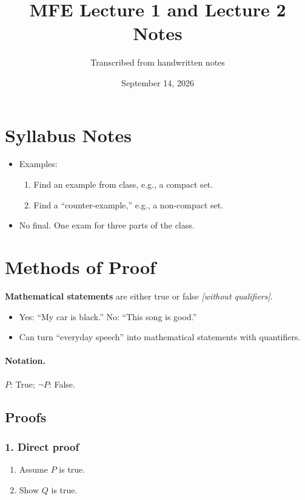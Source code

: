 \documentclass[11pt]{article}
\title{MFE Lecture 1 and Lecture 2 Notes}
\author{Transcribed from handwritten notes}
\date{September 14, 2026}
\newcommand{\note}[1]{\textcolor{red!60!black}{\textit{[#1]}}}
\begin{document}
\maketitle

\section*{Syllabus Notes}
\begin{itemize}
  \item Examples:
  \begin{enumerate}[label=\arabic*)]
    \item Find an example from class, e.g., a compact set.
    \item Find a ``counter-example,'' e.g., a non-compact set.
  \end{enumerate}
  \item No final. One exam for three parts of the class.
\end{itemize}

\section{Methods of Proof}

\textbf{Mathematical statements} are either true or false \note{without qualifiers}.
\begin{itemize}
  \item Yes: ``My car is black.'' \quad No: ``This song is good.''
  \item Can turn ``everyday speech'' into mathematical statements with quantifiers.
\end{itemize}

\paragraph{Notation.} $P$: True; $\neg P$: False.

\subsection{Proofs}

\subsubsection*{1. Direct proof}
\begin{enumerate}[label=\arabic*)]
  \item Assume $P$ is true.
  \item Show $Q$ is true.
\end{enumerate}
\end{document}
